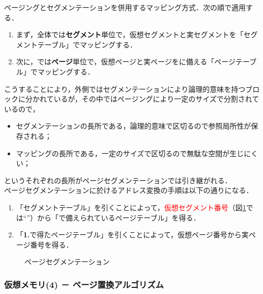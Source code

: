 \begin{enumerate}[label=\textbf{(\Alph*)}, labelsep=10pt, leftmargin=23pt]
		ページングとセグメンテーションを併用するマッピング方式．次の順で適用する．
		\begin{enumerate}[label=\textbf{\arabic*.}, labelsep=10pt, leftmargin=23pt]
			\item まず，全体では\textbf{セグメント}単位で，仮想セグメントと実セグメントを「セグメントテーブル」でマッピングする．
			\item 次に，では\textbf{ページ}単位で，仮想ページと実ページをに備える「ページテーブル」でマッピングする．
		\end{enumerate}
		こうすることにより，外側ではセグメンテーションにより論理的意味を持つブロックに分かれているが，その中ではページングにより一定のサイズで分割されているので，
		\begin{itemize}
			\item セグメンテーションの長所である，論理的意味で区切るので参照局所性が保存される；
			\item マッピングの長所である，一定のサイズで区切るので無駄な空間が生じにくい；
		\end{itemize}
		というそれぞれの長所がページセグメンテーションでは引き継がれる．\\
		ページセグメンテーションに於けるアドレス変換の手順は以下の通りになる．
		\begin{enumerate}[label=\textbf{\arabic*.}, labelsep=10pt, leftmargin=23pt]
			\item 「セグメントテーブル」を引くことによって，\textcolor{red}{仮想セグメント番号}（図\ref{fig27-10}では“\fbox{9}”）から「で備えられているページテーブル」を得る．
			\item 「\textbf{1.}で得たページテーブル」を引くことによって，仮想ページ番号から実ページ番号を得る．
		\end{enumerate}
		\begin{figure}[H]
			\begin{center}
				\caption{ページセグメンテーション}
				\label{fig27-10}
			\end{center}
		\end{figure}
\end{enumerate}



\subsubsection{仮想メモリ(4) － ページ置換アルゴリズム}\label{sec27-2-D-8}


